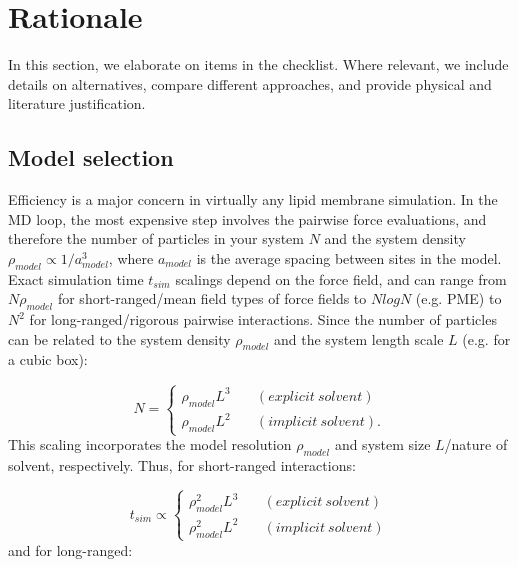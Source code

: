 \documentclass[9pt,bestpractices]{livecoms}
\begin{document}
\section{Rationale}
\label{sec:rationale}

In this section, we elaborate on items in the checklist. Where relevant, we include details on alternatives, compare different approaches, and provide physical and literature justification.

\subsection{Model selection}
\label{subsec:models4}
Efficiency is a major concern in virtually any lipid membrane simulation.
In the MD loop, the most expensive step involves the pairwise force evaluations, and therefore the number of particles in your system $N$ and the system density $\rho_{model} \propto 1/a_{model}^3$, where $a_{model}$ is the average spacing between sites in the model.
Exact simulation time $t_{sim}$ scalings depend on the force field, and can range from $N \rho_{model}$ for short-ranged/mean field types of force fields to $NlogN$ (e.g. PME) to $N^2$ for long-ranged/rigorous pairwise interactions.
Since the number of particles can be related to the system density $\rho_{model}$ and the system length scale $L$ (e.g. for a cubic box):

\begin{equation}\label{eq:12}
	N = \left\{
        		\begin{array}{ll}
            		\rho_{model} L^3 & \quad (explicit \: solvent) \\
            		\rho_{model} L^2 & \quad (implicit \: solvent).
        		\end{array}
    	\right.
\end{equation}
This scaling incorporates the model resolution $\rho_{model}$ and system size $L$/nature of solvent, respectively.
Thus, for short-ranged interactions:

\begin{equation}\label{eq:13}
	t_{sim} \propto \left\{
        		\begin{array}{ll}
            		\rho_{model}^2 L^3 & \quad (explicit \: solvent) \\
            		\rho_{model}^2 L^2 & \quad (implicit \: solvent)
        		\end{array}
    	\right.
\end{equation}
and for long-ranged:
\end{document}

